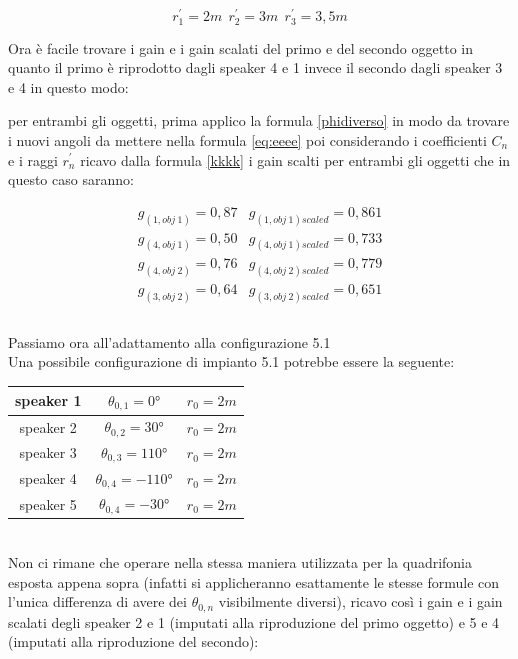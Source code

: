 \documentclass[12pt,a4paper]{report}
\begin{document}
\[r_1^{\prime}=2m \ \  r_2^{\prime}=3m \ \ r_3^{\prime}=3,5m  \]

Ora è facile trovare i gain e i gain scalati del primo e del secondo oggetto in quanto il primo è riprodotto dagli speaker 4 e 1 invece il secondo dagli speaker 3 e 4 in questo modo:

per entrambi gli oggetti, prima applico la formula \ref{phidiverso} in modo da trovare i nuovi angoli da mettere nella formula \ref{eq:eeee} poi considerando i coefficienti $C_n$ e i raggi $r_n^{\prime}$ ricavo dalla formula \ref{kkkk} i gain scalti per entrambi gli oggetti che in questo caso saranno:

\begin{equation}
\begin{matrix}
g_{(1,obj\ 1)} = 0,87 & g_{(1,obj\ 1)scaled} = 0,861\\ 
g_{(4,obj\ 1)} = 0,50 & g_{(4,obj\ 1)scaled} = 0,733\\
g_{(4,obj\ 2)} = 0,76 & g_{(4,obj\ 2)scaled} = 0,779\\
g_{(3,obj\ 2)} = 0,64 & g_{(3,obj\ 2)scaled} = 0,651\\
\end{matrix} 
\label{gscalatiesempio1}
\end{equation}
\\

Passiamo ora all'adattamento alla configurazione 5.1\\

Una possibile configurazione di impianto 5.1 potrebbe essere la seguente:\\

\begin{tabular}{|c|c|c|} 
\hline 
speaker 1 & $\theta_{0,1}=0°$ & $r_0=2m$\\ 
\hline 
speaker 2 & $\theta_{0,2}=30°$ & $r_0=2m$\\ 
\hline 
speaker 3 & $\theta_{0,3}=110°$ & $r_0=2m$\\ 
\hline 
speaker 4 & $\theta_{0,4}=-110°$ & $r_0=2m$\\ 
\hline 
speaker 5 & $\theta_{0,4}=-30°$ & $r_0=2m$\\ 
\hline
\end{tabular} \\

Non ci rimane che operare nella stessa maniera utilizzata per la quadrifonia esposta appena sopra (infatti si applicheranno esattamente le stesse formule con l'unica differenza di avere dei $\theta_{0,n}$ visibilmente diversi), ricavo così i gain e i gain scalati degli speaker 2 e 1 (imputati alla riproduzione del primo oggetto) e 5 e 4 (imputati alla riproduzione del secondo):\\
\end{document}
